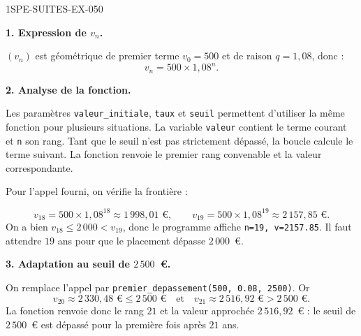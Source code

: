 \begin{corrige}{1SPE-SUITES-EX-050}

\textbf{1. Expression de $v_n$.}


$(v_n)$ est géométrique de premier terme $v_0 = 500$ et de raison $q = 1{,}08$, donc :
\[
v_n = 500 \times 1{,}08^n.
\]

\medskip
\textbf{2. Analyse de la fonction.}

Les paramètres \texttt{valeur\_initiale}, \texttt{taux} et \texttt{seuil} permettent d'utiliser la même fonction pour plusieurs situations. La variable \texttt{valeur} contient le terme courant et \texttt{n} son rang. Tant que le seuil n'est pas strictement dépassé, la boucle calcule le terme suivant. La fonction renvoie le premier rang convenable et la valeur correspondante.

\medskip
Pour l'appel fourni, on vérifie la frontière :

\[
v_{18} = 500 \times 1{,}08^{18} \approx 1\,998{,}01 \text{ €}, \qquad v_{19} = 500 \times 1{,}08^{19} \approx 2\,157{,}85 \text{ €}.
\]
On a bien $v_{18} \leqslant 2\,000 < v_{19}$, donc le programme affiche \texttt{n=19, v=2157.85}. Il faut attendre $19$ ans pour que le placement dépasse $2\,000$~€.

\medskip
\textbf{3. Adaptation au seuil de $2\,500$~\euro{}.}

On remplace l'appel par \texttt{premier\_depassement(500, 0.08, 2500)}. Or
\[
v_{20}\approx 2\,330{,}48 \text{ €}\leq 2\,500 \text{ €}
\quad\text{et}\quad
v_{21}\approx 2\,516{,}92 \text{ €}>2\,500 \text{ €}.
\]
La fonction renvoie donc le rang $21$ et la valeur approchée $2\,516{,}92$~\euro{} : le seuil de $2\,500$~\euro{} est dépassé pour la première fois après $21$ ans.

\end{corrige}

